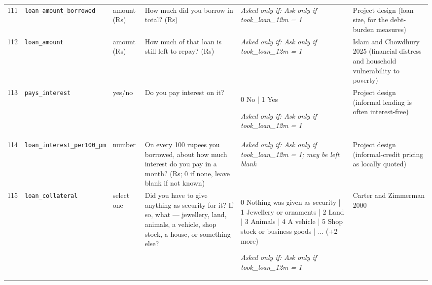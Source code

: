 \documentclass[9pt,a4paper,landscape]{article}
\begin{document}
\begin{longtable}{@{}p{0.5cm}p{3.3cm}p{1.7cm}p{7.3cm}p{5.6cm}p{5.4cm}@{}}
\footnotesize 111 & \footnotesize\texttt{loan\_amount\_borrowed} & \scriptsize amount (Rs) & \footnotesize How much did you borrow in total? (Rs)\par\vspace{1pt}{\footnotesize\color{hdr}{\hifont आपने कुल कितना क़र्ज़ लिया था? (रुपये)}} & \scriptsize \textit{Asked only if: Ask only if took\_loan\_12m = 1} & \scriptsize Project design (loan size, for the debt-burden measures)\\
\footnotesize 112 & \footnotesize\texttt{loan\_amount} & \scriptsize amount (Rs) & \footnotesize How much of that loan is still left to repay? (Rs)\par\vspace{1pt}{\footnotesize\color{hdr}{\hifont उस क़र्ज़ में से अब भी कितना चुकाना बाक़ी है? (रुपये)}} & \scriptsize \textit{Asked only if: Ask only if took\_loan\_12m = 1} & \scriptsize Islam and Chowdhury 2025 (financial distress and household vulnerability to poverty)\\
\footnotesize 113 & \footnotesize\texttt{pays\_interest} & \scriptsize yes/no & \footnotesize Do you pay interest on it?\par\vspace{1pt}{\footnotesize\color{hdr}{\hifont क्या आप उस पर ब्याज देते हैं?}} & \scriptsize 0 No | 1 Yes\par\vspace{1pt}\textit{Asked only if: Ask only if took\_loan\_12m = 1} & \scriptsize Project design (informal lending is often interest-free)\\
\footnotesize 114 & \footnotesize\texttt{loan\_interest\_per100\_pm} & \scriptsize number & \footnotesize On every 100 rupees you borrowed, about how much interest do you pay in a month? (Rs; 0 if none, leave blank if not known)\par\vspace{1pt}{\footnotesize\color{hdr}{\hifont आपने जो 100 रुपये उधार लिए, उन पर महीने का कितना ब्याज देते हैं? (रुपये; दर पता न हो तो खाली छोड़ दें)}} & \scriptsize \textit{Asked only if: Ask only if took\_loan\_12m = 1; may be left blank} & \scriptsize Project design (informal-credit pricing as locally quoted)\\
\footnotesize 115 & \footnotesize\texttt{loan\_collateral} & \scriptsize select one & \footnotesize Did you have to give anything as security for it? If so, what — jewellery, land, animals, a vehicle, shop stock, a house, or something else?\par\vspace{1pt}{\footnotesize\color{hdr}{\hifont आपको क्या गिरवी रखना पड़ा?}} & \scriptsize 0 Nothing was given as security | 1 Jewellery or ornaments | 2 Land | 3 Animals | 4 A vehicle | 5 Shop stock or business goods | ... (+2 more)\par\vspace{1pt}\textit{Asked only if: Ask only if took\_loan\_12m = 1} & \scriptsize Carter and Zimmerman 2000\\

\end{longtable}
\end{document}
